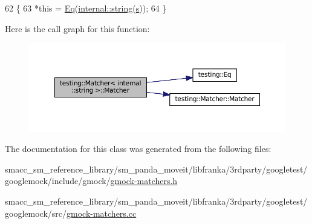 \begin{DoxyCode}
62                                               \{
63   *\textcolor{keyword}{this} = \hyperlink{namespacetesting_a0cb8ba7eae844c871eccb29e7c81635f}{Eq}(\hyperlink{namespacetesting_1_1internal_a8e8ff5b11e64078831112677156cb111}{internal::string}(\hyperlink{namespaceservice__node__3_aa976421a49e0b54f23833423400849ae}{s}));
64 \}
\end{DoxyCode}
Here is the call graph for this function\+:
\nopagebreak
\begin{figure}[H]
\begin{center}
\leavevmode
\includegraphics[width=350pt]{classtesting_1_1Matcher_3_01internal_1_1string_01_4_a65f1d7616edb049ac059ad5d3fa2d625_cgraph}
\end{center}
\end{figure}


The documentation for this class was generated from the following files\+:\begin{DoxyCompactItemize}
\item 
smacc\+\_\+sm\+\_\+reference\+\_\+library/sm\+\_\+panda\+\_\+moveit/libfranka/3rdparty/googletest/googlemock/include/gmock/\hyperlink{gmock-matchers_8h}{gmock-\/matchers.\+h}\item 
smacc\+\_\+sm\+\_\+reference\+\_\+library/sm\+\_\+panda\+\_\+moveit/libfranka/3rdparty/googletest/googlemock/src/\hyperlink{gmock-matchers_8cc}{gmock-\/matchers.\+cc}\end{DoxyCompactItemize}
